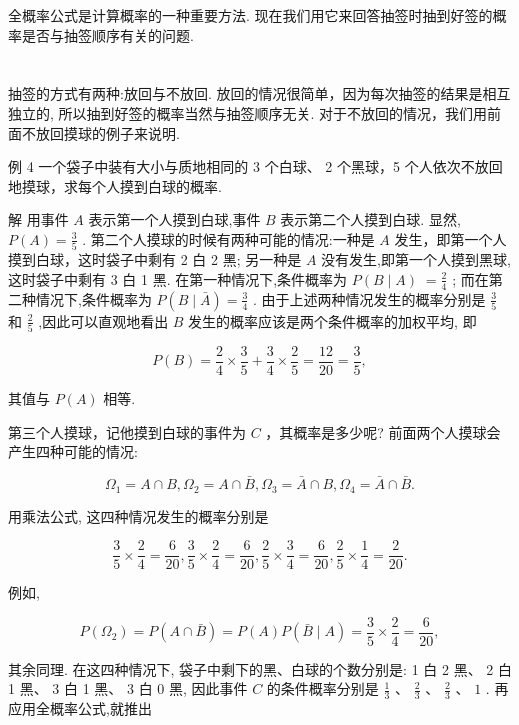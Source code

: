 \documentclass[10pt]{article}
\begin{document}
全概率公式是计算概率的一种重要方法. 现在我们用它来回答抽签时抽到好签的概率是否与抽签顺序有关的问题.

\section*{}

抽签的方式有两种:放回与不放回. 放回的情况很简单，因为每次抽签的结果是相互独立的, 所以抽到好签的概率当然与抽签顺序无关. 对于不放回的情况，我们用前面不放回摸球的例子来说明.

例 4 一个袋子中装有大小与质地相同的 3 个白球、 2 个黑球，5 个人依次不放回地摸球，求每个人摸到白球的概率.

解 用事件 \(A\) 表示第一个人摸到白球,事件 \(B\) 表示第二个人摸到白球. 显然, \(P\left( A\right)  = \frac{3}{5}\) . 第二个人摸球的时候有两种可能的情况:一种是 \(A\) 发生，即第一个人摸到白球，这时袋子中剩有 2 白 2 黑; 另一种是 \(A\) 没有发生,即第一个人摸到黑球,这时袋子中剩有 3 白 1 黑. 在第一种情况下,条件概率为 \(P\left( {B \mid  A}\right) \; = \frac{2}{4}\) ; 而在第二种情况下,条件概率为 \(P\left( {B \mid  \bar{A}}\right)  = \frac{3}{4}\) . 由于上述两种情况发生的概率分别是 \(\frac{3}{5}\) 和 \(\frac{2}{5}\) ,因此可以直观地看出 \(B\) 发生的概率应该是两个条件概率的加权平均, 即

\[
P\left( B\right)  = \frac{2}{4} \times  \frac{3}{5} + \frac{3}{4} \times  \frac{2}{5} = \frac{12}{20} = \frac{3}{5},
\]

其值与 \(P\left( A\right)\) 相等.

第三个人摸球，记他摸到白球的事件为 \(C\) ，其概率是多少呢? 前面两个人摸球会产生四种可能的情况:

\[
{\Omega }_{1} = A \cap  B,{\Omega }_{2} = A \cap  \bar{B},{\Omega }_{3} = \bar{A} \cap  B,{\Omega }_{4} = \bar{A} \cap  \bar{B}.
\]

用乘法公式, 这四种情况发生的概率分别是

\[
\frac{3}{5} \times  \frac{2}{4} = \frac{6}{20},\frac{3}{5} \times  \frac{2}{4} = \frac{6}{20},\frac{2}{5} \times  \frac{3}{4} = \frac{6}{20},\frac{2}{5} \times  \frac{1}{4} = \frac{2}{20}.
\]

例如,

\[
P\left( {\Omega }_{2}\right)  = P\left( {A \cap  \bar{B}}\right)  = P\left( A\right) P\left( {\bar{B} \mid  A}\right)  = \frac{3}{5} \times  \frac{2}{4} = \frac{6}{20},
\]

其余同理. 在这四种情况下, 袋子中剩下的黑、白球的个数分别是: 1 白 2 黑、 2 白 1 黑、 3 白 1 黑、 3 白 0 黑, 因此事件 \(C\) 的条件概率分别是 \(\frac{1}{3}\text{ 、 }\frac{2}{3}\text{ 、 }\frac{2}{3}\text{ 、 }1\) . 再应用全概率公式,就推出
\end{document}
